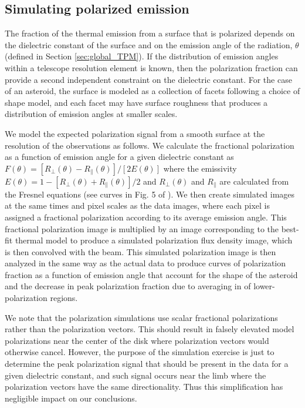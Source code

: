 \documentclass[]{aastex631}
\begin{document}
\subsection{Simulating polarized emission}\label{sec:pol}

The fraction of the thermal emission from a surface that is polarized depends on the dielectric constant of the surface and on the emission angle of the radiation, $\theta$ (defined in Section \ref{sec:global_TPM}). If the distribution of emission angles within a telescope resolution element is known, then the polarization fraction can provide a second independent constraint on the dielectric constant. For the case of an asteroid, the surface is modeled as a collection of facets following a choice of shape model, and each facet may have surface roughness that produces a distribution of emission angles at smaller scales. 

We model the expected polarization signal from a smooth surface at the resolution of the observations as follows. We calculate the fractional polarization as a function of emission angle for a given dielectric constant as $F(\theta)=[R_{\perp}(\theta)-R_{\parallel}(\theta)]/[2E(\theta)]$ where the emissivity $E(\theta)=1-[R_{\perp}(\theta)+R_{\parallel}(\theta)]/2$ and $R_{\perp}(\theta)$ and $R_{\parallel}$ are calculated from the Fresnel equations \citep{jackson1975} (see curves in Fig. 5 of \citet{dekleer2021}). We then create simulated images at the same times and pixel scales as the data images, where each pixel is assigned a fractional polarization according to its average emission angle. This fractional polarization image is multiplied by an image corresponding to the best-fit thermal model to produce a simulated polarization flux density image, which is then convolved with the beam. This simulated polarization image is then analyzed in the same way as the actual data to produce curves of polarization fraction as a function of emission angle that account for the shape of the asteroid and the decrease in peak polarization fraction due to averaging in of lower-polarization regions.

 We note that the polarization simulations use scalar fractional polarizations rather than the polarization vectors. This should result in falsely elevated model polarizations near the center of the disk where polarization vectors would otherwise cancel. However, the purpose of the simulation exercise is just to determine the peak polarization signal that should be present in the data for a given dielectric constant, and such signal occurs near the limb where the polarization vectors have the same directionality. Thus this simplification has negligible impact on our conclusions.
\end{document}
